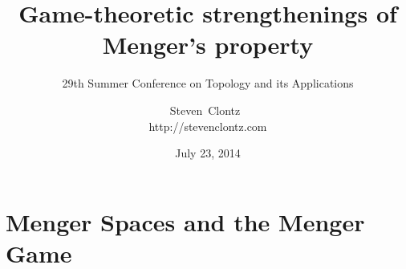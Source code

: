 \documentclass{beamer}
\title
{Game-theoretic strengthenings of Menger's property}
\subtitle
{29th Summer Conference on Topology and its Applications} %
\author%
{Steven~Clontz~\\http://stevenclontz.com}%
\institute[Auburn University] %
{
  Department of Mathematics and Statistics\\
  Auburn University}
\date[14-07-23] %
{July 23, 2014}
\theoremstyle{definition}
\newcommand{\<}{\langle}
\renewcommand{\>}{\rangle}
\begin{document}
\renewcommand{\pause}{}
\newcommand{\vpause}{\pause\vspace{1em}}

\begin{frame}
  \titlepage
\end{frame}








\section{Menger Spaces and the Menger Game}
\end{document}
